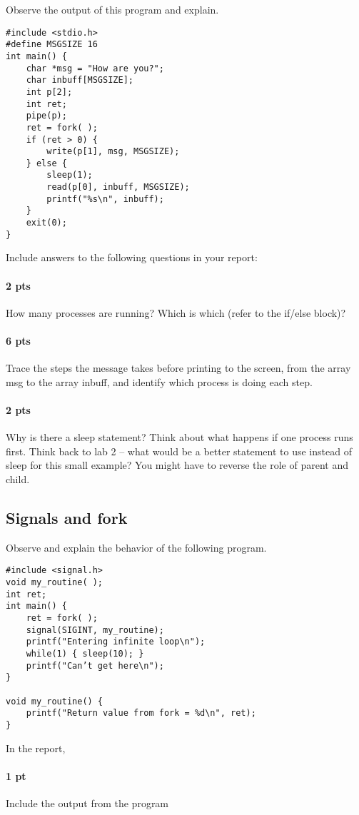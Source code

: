 \documentclass[letterpaper,10pt]{article}
\begin{document}
Observe the output of this program and explain.

\begin{verbatim}
#include <stdio.h>
#define MSGSIZE 16
int main() {
    char *msg = "How are you?";
    char inbuff[MSGSIZE];
    int p[2];
    int ret;
    pipe(p);
    ret = fork( );
    if (ret > 0) {
        write(p[1], msg, MSGSIZE);
    } else {
        sleep(1);
        read(p[0], inbuff, MSGSIZE);
        printf("%s\n", inbuff);
    }
    exit(0);
}
\end{verbatim}
Include answers to the following questions in your report:
\paragraph{2 pts} How many processes are running? Which is which (refer to the if/else block)?
\paragraph{6 pts} Trace the steps the message takes before printing to the screen, from the array msg to the
         array inbuff, and identify which process is doing each step.
\paragraph{2 pts} Why is there a sleep statement? Think about what happens if one process runs first. Think
         back to lab 2 -- what would be a better statement to use instead of sleep for this small example?
         You might have to reverse the role of parent and child.

\subsection{Signals and fork}
Observe and explain the behavior of the following program.
\begin{verbatim}
#include <signal.h>
void my_routine( );
int ret;
int main() {
    ret = fork( );
    signal(SIGINT, my_routine);
    printf("Entering infinite loop\n");
    while(1) { sleep(10); }
    printf("Can’t get here\n");
}

void my_routine() {
    printf("Return value from fork = %d\n", ret);
}
\end{verbatim}

In the report,
\paragraph{1 pt} Include the output from the program
\end{document}
